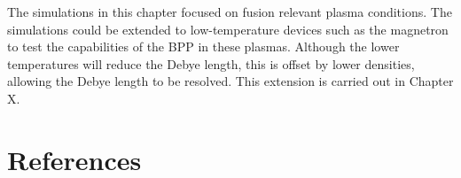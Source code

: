 The simulations in this chapter focused on fusion relevant plasma conditions. The simulations could be extended to low-temperature devices such as the magnetron to test the capabilities of the BPP in these plasmas.  Although the lower temperatures will reduce the Debye length, this is offset by lower densities, allowing the Debye length to be resolved. This extension is carried out in Chapter X.









	
	
	
	
	
	
\section{References}

	
 

